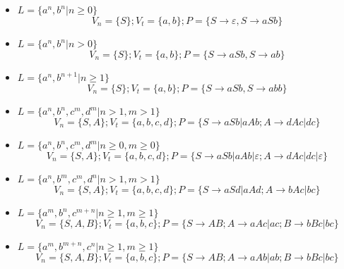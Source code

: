 \documentclass[12pt]{article}
\begin{document}
\begin{itemize}

    \item $L= \{ a^n, b^n | n \geq  0 \}$
          \begin{equation}
              V_n = \{S\}; V_t = \{a,b\}; P = \{S  \to  \varepsilon  , S \to aSb  \}
          \end{equation}

    \item $L= \{ a^n, b^n | n >  0 \}$
          \begin{equation}
              V_n = \{S\}; V_t = \{a,b\}; P = \{S  \to  aSb , S \to ab  \}
          \end{equation}

    \item $L= \{ a^n, b^{n+1} | n \geq  1 \}$
          \begin{equation}
              V_n = \{S\}; V_t = \{a,b\}; P = \{S  \to  aSb , S \to abb  \}
          \end{equation}

    \item $L= \{ a^n, b^n, c^m,d^m | n > 1, m >1 \}$
          \begin{equation}
              V_n = \{S,A\}; V_t = \{a,b,c,d\}; P = \{S  \to  aSb | aAb ; A \to dAc | dc  \}
          \end{equation}

    \item $L= \{ a^n, b^n, c^m,d^m | n \geq 0 , m \geq 0 \}$
          \begin{equation}
              V_n = \{S,A\}; V_t = \{a,b,c,d\}; P = \{S  \to  aSb | aAb | \varepsilon ; A \to dAc | dc | \varepsilon \}
          \end{equation}

    \item $L= \{ a^n, b^m, c^m,d^n | n >1  , m >1 \}$
          \begin{equation}
              V_n = \{S,A\}; V_t = \{a,b,c,d\}; P = \{S  \to  aSd | aAd ; A \to bAc | bc\}
          \end{equation}

    \item $L= \{ a^m, b^n, c^{m+n}| n \geq 1, m \geq 1 \}$
          \begin{equation}
              V_n = \{S,A,B\}; V_t = \{a,b,c\}; P = \{S  \to  AB ; A \to aAc | ac; B \to bBc | bc  \}
          \end{equation}

    \item $L= \{ a^m, b^{m+n}, c^n| n \geq 1, m \geq 1 \}$
          \begin{equation}
              V_n = \{S,A,B\}; V_t = \{a,b,c\}; P = \{S  \to  AB ; A \to aAb | ab; B \to bBc | bc  \}
          \end{equation}



\end{itemize}
\end{document}
